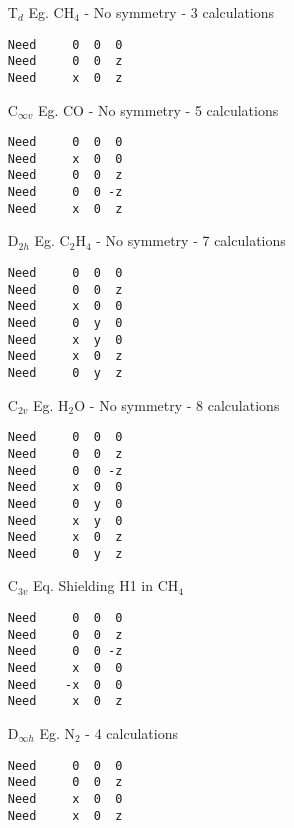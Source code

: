 \begin{itemize}
\item[T$_d$]   Eg. CH$_4$ - No symmetry - 3 calculations

\begin{verbatim}
Need     0  0  0
Need     0  0  z
Need     x  0  z
\end{verbatim}

\item[C$_{\infty v}$] Eg. CO - No symmetry - 5 calculations

\begin{verbatim}
Need     0  0  0
Need     x  0  0
Need     0  0  z
Need     0  0 -z
Need     x  0  z
\end{verbatim}

\item[D$_{2h}$] Eg. C$_2$H$_4$ -  No symmetry - 7 calculations

\begin{verbatim}
Need     0  0  0
Need     0  0  z
Need     x  0  0
Need     0  y  0
Need     x  y  0
Need     x  0  z
Need     0  y  z
\end{verbatim}

\item[C$_{2v}$] Eg. H$_2$O - No symmetry - 8 calculations

\begin{verbatim}
Need     0  0  0
Need     0  0  z
Need     0  0 -z
Need     x  0  0
Need     0  y  0
Need     x  y  0
Need     x  0  z
Need     0  y  z
\end{verbatim}

\item[C$_{3v}$] Eq. Shielding H1 in CH$_4$

\begin{verbatim}
Need     0  0  0
Need     0  0  z
Need     0  0 -z
Need     x  0  0
Need    -x  0  0
Need     x  0  z
\end{verbatim}

\item[D$_{\infty h}$] Eg. N$_2$ -  4 calculations

\begin{verbatim}
Need     0  0  0
Need     0  0  z
Need     x  0  0
Need     x  0  z
\end{verbatim}
\end{itemize}

%
%
%
%
%
